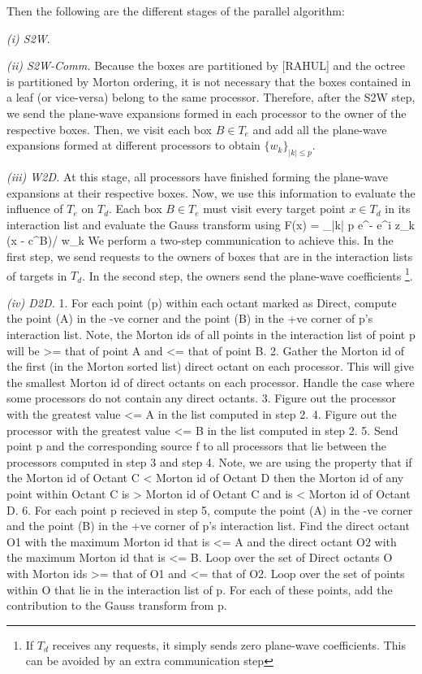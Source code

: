 Then the following are the different stages of the parallel algorithm:

{\em (i) S2W}. 

{\em (ii) S2W-Comm.} Because the boxes are partitioned by [RAHUL] and the octree is partitioned by Morton ordering, it is not necessary that the boxes contained in a leaf (or vice-versa) belong to the same processor. Therefore, after the S2W step, we send the plane-wave expansions formed in each processor to the owner of the respective boxes. Then, we visit each box $B \in T_e$ and add all the plane-wave expansions formed at different processors to obtain $\{w_k \}_{|k| \leq p}$.  

{\em (iii) W2D.} At this stage, all processors have finished forming the plane-wave expansions at their respective boxes. 
Now, we use this information to evaluate the influence of $T_e$ on $T_d$. Each box $B \in T_e$ must visit every target point $x \in T_d$ in its interaction list and evaluate the Gauss transform using
%
\beq F(x) = \sum_{|k| \leq p} e^{-} e^{i z_k \cdot (x - c^B)/\sqrt{\delta}} w_k \eeq
%
We perform a two-step communication to achieve this. In the first step, we send requests to the owners of boxes that are in the interaction lists of targets in $T_d$. In the second step, the owners send the plane-wave coefficients \footnote{ If $T_d$ receives any requests, it simply sends zero plane-wave coefficients. This can be avoided by an extra communication step}. 

{\em (iv) D2D.}
1. For each point (p) within each octant marked as Direct, compute the
point (A) in the -ve corner and the point (B) in the +ve corner of p's
interaction list. Note, the Morton ids of all points in the interaction
list of point p will be >= that of point A and <= that of point B.
2. Gather the Morton id of the first (in the Morton sorted list) direct
octant on each processor. This will give the smallest Morton id of
direct octants on each processor. Handle the case where some processors
do not contain any direct octants.
3. Figure out the processor with the greatest value <= A in the list
computed in step 2.
4. Figure out the processor with the greatest value <= B in the list
computed in step 2.
5. Send point p and the corresponding source f to all processors that
lie between the processors computed in step 3 and step 4. Note, we are 
using the property that if the Morton id of Octant C < Morton id of 
Octant D then the Morton id of any point within Octant C is >  Morton
id of Octant C and is < Morton id of Octant D.
6. For each point p recieved in step 5, compute the
point (A) in the -ve corner and the point (B) in the +ve corner of p's
interaction list. Find the direct octant O1 with the maximum Morton id that
is <= A and the direct octant O2 with the maximum Morton id that is <=
B. Loop over the set of Direct octants O with Morton ids >= that of O1
and <= that of O2. Loop over the set of points within O that lie in the
interaction list of p. For each of these points, add the contribution to
the Gauss transform from p.

